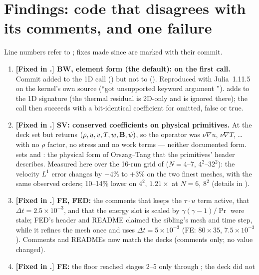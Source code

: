 \documentclass[10pt]{article}
\begin{document}
\section*{Findings: code that disagrees with its comments, and one failure}
\noindent\small Line numbers refer to \commit; fixes made since are marked with their commit.\normalsize
\begin{enumerate}[leftmargin=*]
\item \textbf{[Fixed in .] BW, element form (the default):  on the first \dsgs{}
call.} Commit  added  to the 1D call () but not to
 (). Reproduced with Julia~1.11.5 on the
kernel's own source (``got unsupported keyword argument '').  adds
 to the 1D signature (the thermal residual is 2D-only and is ignored there); the call then
succeeds with a bit-identical coefficient for  omitted, false or true.
\item \textbf{[Fixed in .] SV: conserved coefficients on physical primitives.} At \commit{} the deck set
 but  returns $(\rho,u,v,T,w,\mathbf{B},\psi)$, so the operator was
$\nu\nabla u$, $\nu\nabla T$, \dots{} with no $\rho$ factor, no stress and no work terms --- neither documented form.
 sets  and : the physical form of
Orszag--Tang that the primitives' header describes. Measured here over the 16-run grid of  ($N=4$--7, $4^2$--$32^2$): the velocity $L^1$ error changes by $-4\%$ to $+3\%$ on the two finest meshes, with the same observed orders; 10--14\% lower on $4^2$, $1.21\times$ at $N=6$, $8^2$ (details in ).
\item \textbf{[Fixed in .] FE, FED:} the comments that  keeps the $\tau\cdot u$ term active,
that $\Delta t=2.5\times10^{-3}$, and that the energy slot is scaled by $\gamma(\gamma-1)/\Pr$ were stale; FED's header and
README claimed the sibling's mesh and time step, while it refines the mesh once and uses $\Delta t=5\times10^{-3}$
(FE: $80\times35$, $7.5\times10^{-3}$). Comments and READMEs now match the decks (comments only; no value changed).
\item \textbf{[Fixed in .] FE:} the floor reached stages 2--5 only through ; the deck did not

\end{enumerate}
\end{document}

